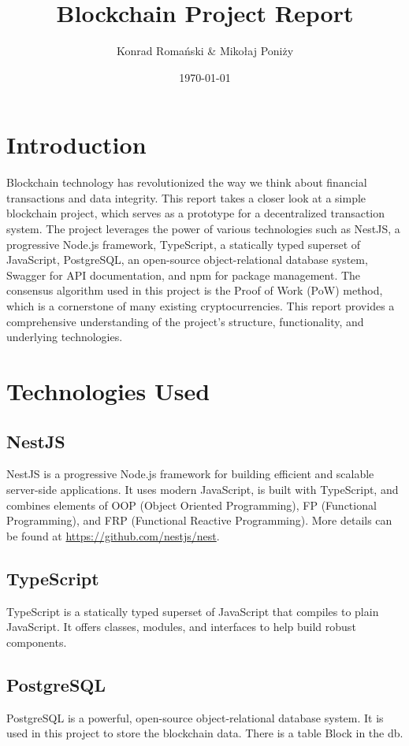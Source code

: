 \documentclass{article}
\title{Blockchain Project Report}
\author{Konrad Romański & Mikołaj Poniży }
\date{\today}
\begin{document}
\maketitle

\tableofcontents
\newpage

\section{Introduction}
Blockchain technology has revolutionized the way we think about financial transactions and data integrity. This report takes a closer look at a simple blockchain project, which serves as a prototype for a decentralized transaction system. The project leverages the power of various technologies such as NestJS, a progressive Node.js framework, TypeScript, a statically typed superset of JavaScript, PostgreSQL, an open-source object-relational database system, Swagger for API documentation, and npm for package management. The consensus algorithm used in this project is the Proof of Work (PoW) method, which is a cornerstone of many existing cryptocurrencies. This report  provides a comprehensive understanding of the project's structure, functionality, and underlying technologies.


\section{Technologies Used}
\subsection{NestJS}
NestJS is a progressive Node.js framework for building efficient and scalable server-side applications. It uses modern JavaScript, is built with TypeScript, and combines elements of OOP (Object Oriented Programming), FP (Functional Programming), and FRP (Functional Reactive Programming). More details can be found at \url{https://github.com/nestjs/nest}.

\subsection{TypeScript}
TypeScript is a statically typed superset of JavaScript that compiles to plain JavaScript. It offers classes, modules, and interfaces to help build robust components.

\subsection{PostgreSQL}
PostgreSQL is a powerful, open-source object-relational database system. It is used in this project to store the blockchain data. There is a table Block in the db.
\end{document}

